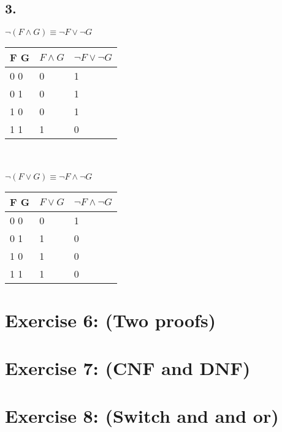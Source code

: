 \documentclass[12pt]{article}
\begin{document}
\subsection*{3.}
$\neg (F \land G) \equiv \neg F \lor \neg G$\\
\begin{tabular}{  l | l | l }
	F G & $F \land G$ & $\neg F \lor \neg G$  \\ \hline
	0 0 & 0 & 1  \\
	0 1 & 0 & 1  \\
	1 0 & 0 & 1  \\
	1 1 & 1 & 0  \\
\end{tabular}\\\\
$\neg (F \lor G) \equiv \neg F \land \neg G$\\
\begin{tabular}{  l | l | l }
	F G & $F \lor G$ & $\neg F \land \neg G$  \\ \hline
	0 0 & 0 & 1 \\
	0 1 & 1 & 0  \\
	1 0 & 1 & 0  \\
	1 1 & 1 & 0  \\
\end{tabular}

\section*{Exercise 6: (Two proofs)}

\section*{Exercise 7: (CNF and DNF)}

\section*{Exercise 8: (Switch and and or)}

\end{document}
